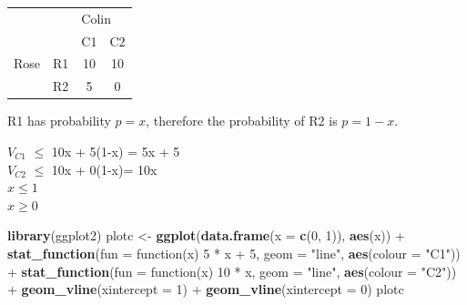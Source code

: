 \documentclass[]{article}
\newenvironment{Shaded}{\begin{snugshade}}{\end{snugshade}}
\newcommand{\KeywordTok}[1]{\textcolor[rgb]{0.13,0.29,0.53}{\textbf{{#1}}}}
\newcommand{\DataTypeTok}[1]{\textcolor[rgb]{0.13,0.29,0.53}{{#1}}}
\newcommand{\DecValTok}[1]{\textcolor[rgb]{0.00,0.00,0.81}{{#1}}}
\newcommand{\StringTok}[1]{\textcolor[rgb]{0.31,0.60,0.02}{{#1}}}
\newcommand{\NormalTok}[1]{{#1}}
\begin{document}
\begin{table}[!h]
\centering
\begin{tabular}{lllc}
 &  & \multicolumn{2}{l}{Colin} \\ \cline{3-4}
 &  & C1 & \multicolumn{1}{l}{C2} \\ \hline
Rose & R1 & \multicolumn{1}{c}{10} & 10 \\
 & R2 & \multicolumn{1}{c}{5} & 0 \\ \hline
\end{tabular}
\end{table}

R1 has probability \(p = x\), therefore the probability of R2 is
\(p=1-x\).

\(V_{C1}\) \(\leq\) 10x + 5(1-x) = 5x + 5\\
\(V_{C2}\) \(\leq\) 10x + 0(1-x)= 10x\\
\(x \leq 1\)\\
\(x \geq 0\)

\begin{Shaded}
\begin{Highlighting}[]
\KeywordTok{library}\NormalTok{(ggplot2)}
\NormalTok{plotc <-}\StringTok{ }\KeywordTok{ggplot}\NormalTok{(}\KeywordTok{data.frame}\NormalTok{(}\DataTypeTok{x =} \KeywordTok{c}\NormalTok{(}\DecValTok{0}\NormalTok{, }\DecValTok{1}\NormalTok{)), }\KeywordTok{aes}\NormalTok{(x)) +}\StringTok{ }\KeywordTok{stat_function}\NormalTok{(}\DataTypeTok{fun =} \NormalTok{function(x) }\DecValTok{5} \NormalTok{*}\StringTok{ }
\StringTok{    }\NormalTok{x +}\StringTok{ }\DecValTok{5}\NormalTok{, }\DataTypeTok{geom =} \StringTok{"line"}\NormalTok{, }\KeywordTok{aes}\NormalTok{(}\DataTypeTok{colour =} \StringTok{"C1"}\NormalTok{)) +}\StringTok{ }\KeywordTok{stat_function}\NormalTok{(}\DataTypeTok{fun =} \NormalTok{function(x) }\DecValTok{10} \NormalTok{*}\StringTok{ }
\StringTok{    }\NormalTok{x, }\DataTypeTok{geom =} \StringTok{"line"}\NormalTok{, }\KeywordTok{aes}\NormalTok{(}\DataTypeTok{colour =} \StringTok{"C2"}\NormalTok{)) +}\StringTok{ }\KeywordTok{geom_vline}\NormalTok{(}\DataTypeTok{xintercept =} \DecValTok{1}\NormalTok{) +}\StringTok{ }\KeywordTok{geom_vline}\NormalTok{(}\DataTypeTok{xintercept =} \DecValTok{0}\NormalTok{)}
\NormalTok{plotc}
\end{Highlighting}
\end{Shaded}
\end{document}
